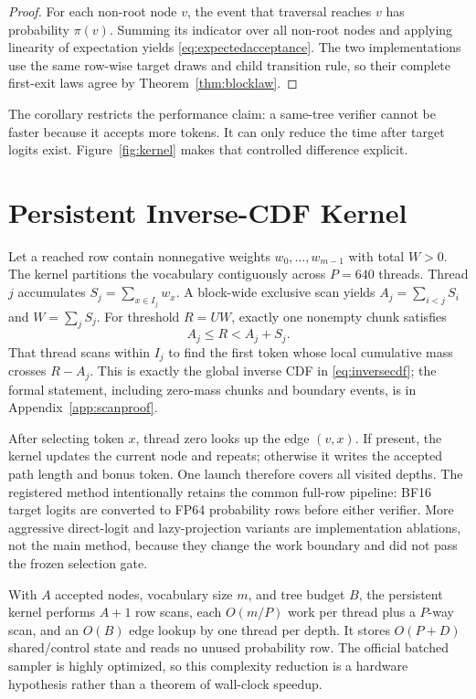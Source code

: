 \documentclass{article}
\begin{document}
\begin{proof}
For each non-root node $v$, the event that traversal reaches $v$ has probability $\pi(v)$.  Summing its indicator over all non-root nodes and applying linearity of expectation yields \eqref{eq:expectedacceptance}.  The two implementations use the same row-wise target draws and child transition rule, so their complete first-exit laws agree by Theorem~\ref{thm:blocklaw}.
\end{proof}

The corollary restricts the performance claim: a same-tree verifier cannot be faster because it accepts more tokens.  It can only reduce the time after target logits exist.  Figure~\ref{fig:kernel} makes that controlled difference explicit.

\section{Persistent Inverse-CDF Kernel}
\label{sec:kernel}

Let a reached row contain nonnegative weights $w_0,\ldots,w_{m-1}$ with total $W>0$.  The kernel partitions the vocabulary contiguously across $P=640$ threads.  Thread $j$ accumulates
$S_j=\sum_{x\in I_j}w_x$.  A block-wide exclusive scan yields $A_j=\sum_{i<j}S_i$ and $W=\sum_jS_j$.  For threshold $R=UW$, exactly one nonempty chunk satisfies
\begin{equation}
 A_j\le R<A_j+S_j.
\end{equation}
That thread scans within $I_j$ to find the first token whose local cumulative mass crosses $R-A_j$.  This is exactly the global inverse CDF in \eqref{eq:inversecdf}; the formal statement, including zero-mass chunks and boundary events, is in Appendix~\ref{app:scanproof}.

After selecting token $x$, thread zero looks up the edge $(v,x)$.  If present, the kernel updates the current node and repeats; otherwise it writes the accepted path length and bonus token.  One launch therefore covers all visited depths.  The registered method intentionally retains the common full-row pipeline: BF16 target logits are converted to FP64 probability rows before either verifier.  More aggressive direct-logit and lazy-projection variants are implementation ablations, not the main method, because they change the work boundary and did not pass the frozen selection gate.

With $A$ accepted nodes, vocabulary size $m$, and tree budget $B$, the persistent kernel performs $A+1$ row scans, each $O(m/P)$ work per thread plus a $P$-way scan, and an $O(B)$ edge lookup by one thread per depth.  It stores $O(P+D)$ shared/control state and reads no unused probability row.  The official batched sampler is highly optimized, so this complexity reduction is a hardware hypothesis rather than a theorem of wall-clock speedup.
\end{document}
